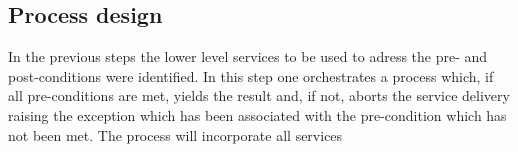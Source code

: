 \subsection{Process design}
In the previous steps the lower level services to be used to adress the pre- and post-conditions were identified. In this step one orchestrates a process which, if all pre-conditions are met, yields the result and, if not, aborts the service delivery raising the exception which has been associated with the pre-condition which has not been met. The process will incorporate all services








